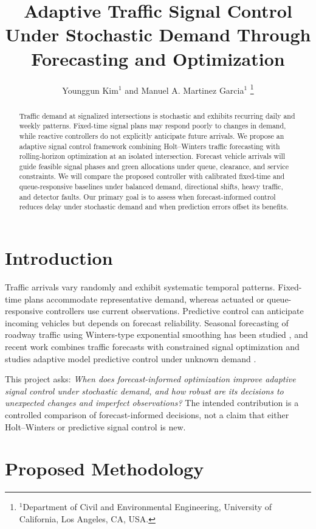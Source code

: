 \documentclass[letterpaper,12pt,conference]{ieeeconf}
\title{\LARGE \bf
Adaptive Traffic Signal Control Under Stochastic Demand Through Forecasting and Optimization}
\author{
Younggun Kim$^{1}$ and Manuel A. Martinez Garcia$^{1}$%
\thanks{$^{1}$Department of Civil and Environmental Engineering,
University of California, Los Angeles, CA, USA.}%
}
\begin{document}
\maketitle
\thispagestyle{empty}
\pagestyle{empty}

\begin{abstract}
Traffic demand at signalized intersections is stochastic and exhibits recurring daily and weekly patterns. Fixed-time signal plans may respond poorly to changes in demand, while reactive controllers do not explicitly anticipate future arrivals. We propose an adaptive signal control framework combining Holt--Winters traffic forecasting with rolling-horizon optimization at an isolated intersection. Forecast vehicle arrivals will guide feasible signal phases and green allocations under queue, clearance, and service constraints. We will compare the proposed controller with calibrated fixed-time and queue-responsive baselines under balanced demand, directional shifts, heavy traffic, and detector faults. Our primary goal is to assess when forecast-informed control reduces delay under stochastic demand and when prediction errors offset its benefits.
\end{abstract}

\section{Introduction}
Traffic arrivals vary randomly and exhibit systematic temporal patterns. Fixed-time plans accommodate representative demand, whereas actuated or queue-responsive controllers use current observations. Predictive control can anticipate incoming vehicles but depends on forecast reliability. Seasonal forecasting of roadway traffic using Winters-type exponential smoothing has been studied \cite{williams1998,yu2016}, and recent work combines traffic forecasts with constrained signal optimization \cite{atef2026} and studies adaptive model predictive control under unknown demand \cite{li2025}.

This project asks: \emph{When does forecast-informed optimization improve adaptive signal control under stochastic demand, and how robust are its decisions to unexpected changes and imperfect observations?} The intended contribution is a controlled comparison of forecast-informed decisions, not a claim that either Holt--Winters or predictive signal control is new.

\section{Proposed Methodology}
\end{document}
